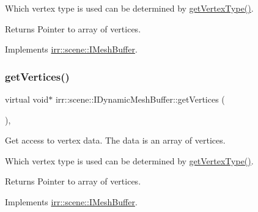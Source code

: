 Which vertex type is used can be determined by \hyperlink{classirr_1_1scene_1_1IDynamicMeshBuffer_a3e7523774efaf9a177de6396dfdc14e2}{get\+Vertex\+Type()}. \begin{DoxyReturn}{Returns}
Pointer to array of vertices. 
\end{DoxyReturn}


Implements \hyperlink{classirr_1_1scene_1_1IMeshBuffer_ac1695efc198b05a086487606bc2783e7}{irr\+::scene\+::\+I\+Mesh\+Buffer}.

\mbox{\label{classirr_1_1scene_1_1IDynamicMeshBuffer_a449643505823c7cfe793c5a82cde5fa4}} 
\subsubsection{\texorpdfstring{get\+Vertices()}{getVertices()}\hspace{0.1cm}{\footnotesize\ttfamily [4/4]}}
{\footnotesize\ttfamily virtual void$\ast$ irr\+::scene\+::\+I\+Dynamic\+Mesh\+Buffer\+::get\+Vertices (\begin{DoxyParamCaption}{ }\end{DoxyParamCaption})\hspace{0.3cm}{\ttfamily [inline]}, {\ttfamily [virtual]}}



Get access to vertex data. The data is an array of vertices. 

Which vertex type is used can be determined by \hyperlink{classirr_1_1scene_1_1IDynamicMeshBuffer_a3e7523774efaf9a177de6396dfdc14e2}{get\+Vertex\+Type()}. \begin{DoxyReturn}{Returns}
Pointer to array of vertices. 
\end{DoxyReturn}


Implements \hyperlink{classirr_1_1scene_1_1IMeshBuffer_ac1695efc198b05a086487606bc2783e7}{irr\+::scene\+::\+I\+Mesh\+Buffer}.

\mbox{\label{classirr_1_1scene_1_1IDynamicMeshBuffer_adbe127e3774de6ae7ce96cb534a336e5}} 
